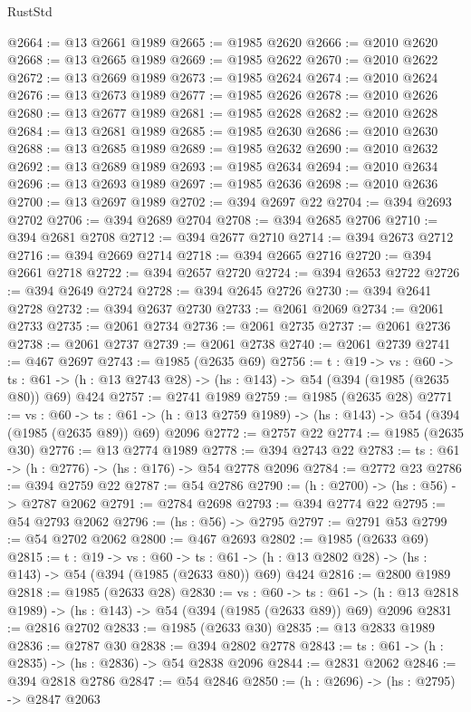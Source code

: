 \begin{lexlean}{RustStd}
\begin{coremodule}
{\begin{coremodule}
{{{{{{{{@2664 := @13 @2661 @1989
@2665 := @1985 @2620
@2666 := @2010 @2620
@2668 := @13 @2665 @1989
@2669 := @1985 @2622
@2670 := @2010 @2622
@2672 := @13 @2669 @1989
@2673 := @1985 @2624
@2674 := @2010 @2624
@2676 := @13 @2673 @1989
@2677 := @1985 @2626
@2678 := @2010 @2626
@2680 := @13 @2677 @1989
@2681 := @1985 @2628
@2682 := @2010 @2628
@2684 := @13 @2681 @1989
@2685 := @1985 @2630
@2686 := @2010 @2630
@2688 := @13 @2685 @1989
@2689 := @1985 @2632
@2690 := @2010 @2632
@2692 := @13 @2689 @1989
@2693 := @1985 @2634
@2694 := @2010 @2634
@2696 := @13 @2693 @1989
@2697 := @1985 @2636
@2698 := @2010 @2636
@2700 := @13 @2697 @1989
@2702 := @394 @2697 @22
@2704 := @394 @2693 @2702
@2706 := @394 @2689 @2704
@2708 := @394 @2685 @2706
@2710 := @394 @2681 @2708
@2712 := @394 @2677 @2710
@2714 := @394 @2673 @2712
@2716 := @394 @2669 @2714
@2718 := @394 @2665 @2716
@2720 := @394 @2661 @2718
@2722 := @394 @2657 @2720
@2724 := @394 @2653 @2722
@2726 := @394 @2649 @2724
@2728 := @394 @2645 @2726
@2730 := @394 @2641 @2728
@2732 := @394 @2637 @2730
@2733 := @2061 @2069
@2734 := @2061 @2733
@2735 := @2061 @2734
@2736 := @2061 @2735
@2737 := @2061 @2736
@2738 := @2061 @2737
@2739 := @2061 @2738
@2740 := @2061 @2739
@2741 := @467 @2697
@2743 := @1985 (@2635 @69)
@2756 := {t : @19} ->
  {vs : @60} ->
  {ts : @61} -> (h : @13 @2743 @28) -> (hs : @143) -> @54 (@394 (@1985 (@2635 @80)) @69) @424
@2757 := @2741 @1989
@2759 := @1985 (@2635 @28)
@2771 := {vs : @60} ->
  {ts : @61} -> (h : @13 @2759 @1989) -> (hs : @143) -> @54 (@394 (@1985 (@2635 @89)) @69) @2096
@2772 := @2757 @22
@2774 := @1985 (@2635 @30)
@2776 := @13 @2774 @1989
@2778 := @394 @2743 @22
@2783 := {ts : @61} -> (h : @2776) -> (hs : @176) -> @54 @2778 @2096
@2784 := @2772 @23
@2786 := @394 @2759 @22
@2787 := @54 @2786
@2790 := (h : @2700) -> (hs : @56) -> @2787 @2062
@2791 := @2784 @2698
@2793 := @394 @2774 @22
@2795 := @54 @2793 @2062
@2796 := (hs : @56) -> @2795
@2797 := @2791 @53
@2799 := @54 @2702 @2062
@2800 := @467 @2693
@2802 := @1985 (@2633 @69)
@2815 := {t : @19} ->
  {vs : @60} ->
  {ts : @61} -> (h : @13 @2802 @28) -> (hs : @143) -> @54 (@394 (@1985 (@2633 @80)) @69) @424
@2816 := @2800 @1989
@2818 := @1985 (@2633 @28)
@2830 := {vs : @60} ->
  {ts : @61} -> (h : @13 @2818 @1989) -> (hs : @143) -> @54 (@394 (@1985 (@2633 @89)) @69) @2096
@2831 := @2816 @2702
@2833 := @1985 (@2633 @30)
@2835 := @13 @2833 @1989
@2836 := @2787 @30
@2838 := @394 @2802 @2778
@2843 := {ts : @61} -> (h : @2835) -> (hs : @2836) -> @54 @2838 @2096
@2844 := @2831 @2062
@2846 := @394 @2818 @2786
@2847 := @54 @2846
@2850 := (h : @2696) -> (hs : @2795) -> @2847 @2063
}}}}}}}}
\end{coremodule}}
\end{coremodule}
\end{lexlean}
